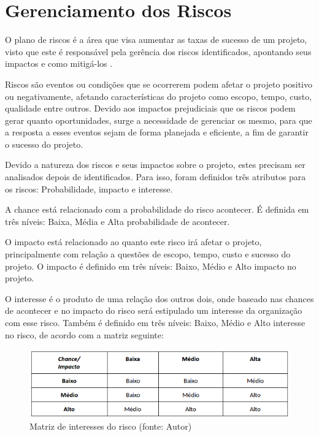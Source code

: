 \chapter[Gerenciamento dos Riscos]{Gerenciamento dos Riscos}

O plano de riscos é a área que visa aumentar as taxas de sucesso de um projeto, visto que este é responsável pela gerência dos riscos identificados, apontando seus impactos e como mitigá-los \cite{pmbok2004}.

Riscos são eventos ou condições que se ocorrerem podem afetar o projeto positivo ou negativamente, afetando características do projeto como escopo, tempo, custo, qualidade entre outros. Devido aos impactos prejudiciais que os riscos podem gerar quanto oportunidades, surge a necessidade de gerenciar os mesmo, para que a resposta a esses eventos sejam de forma planejada e eficiente, a fim de garantir o sucesso do projeto.

Devido a natureza dos riscos e seus impactos sobre o projeto, estes precisam ser analisados depois de identificados. Para isso, foram definidos três atributos para os riscos: Probabilidade, impacto e interesse. 

A chance está relacionado com a probabilidade do risco acontecer. É definida em três níveis: Baixa, Média e Alta probabilidade de acontecer.

O impacto está relacionado ao quanto este risco irá afetar o projeto, principalmente com relação a questões de escopo, tempo, custo e sucesso do projeto. O impacto é definido em três níveis: Baixo, Médio e Alto impacto no projeto.

O interesse é o produto de uma relação dos outros dois, onde baseado nas chances de acontecer e no impacto do risco será estipulado um interesse da organização com esse risco. Também é definido em três níveis: Baixo, Médio e Alto interesse no risco, de acordo com a matriz seguinte:

\begin{figure}[!ht]
\centering
\includegraphics[scale=0.60, angle = 360]{figuras/risco1}
\caption{Matriz de interesses do risco (fonte: Autor)}
\label{Matriz de interesses do risco}
\end{figure}
\FloatBarrier

